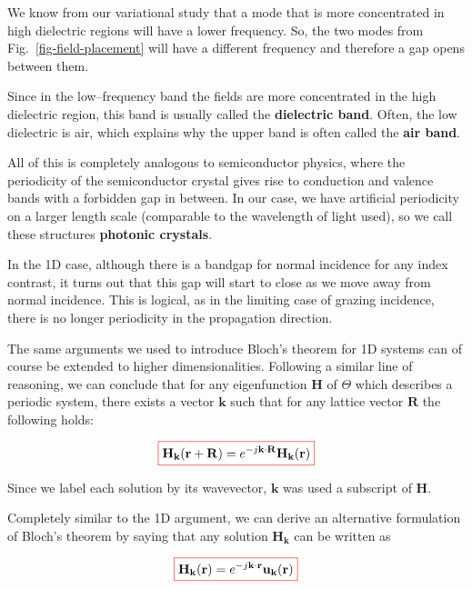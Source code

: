 We know from our variational study that a mode that is more concentrated in high dielectric regions will have a lower frequency. So, the two modes from Fig.~\ref{fig-field-placement} will have a different frequency and therefore a gap opens between them.

Since in the low--frequency band the fields are more concentrated in the high dielectric region, this band is usually called the \textbf{dielectric band}. Often, the low dielectric is air, which explains why the upper band is often called the \textbf{air band}.

All of this is completely analogous to semiconductor physics, where the periodicity of the semiconductor crystal gives rise to conduction and valence bands with a forbidden gap in between. In our case, we have artificial periodicity on a larger length scale (comparable to the wavelength of light used), so we call these structures \textbf{photonic crystals}.

In the 1D case, although there is a bandgap for normal incidence for any index contrast, it turns out that this gap will start to close as we move away from normal incidence. This is logical, as in the limiting case of grazing incidence, there is no longer periodicity in the propagation direction.

\pagebreak


The same arguments we used to introduce Bloch's theorem for 1D systems can of course be extended to higher dimensionalities. Following a similar line of reasoning, we can conclude that for any eigenfunction ${\mathbf H}$ of $\Theta$ which describes a periodic system, there exists a vector ${\mathbf k}$ such that for any lattice vector ${\mathbf R}$ the following holds:

\begin{equation}
\fbox{$\displaystyle
{\mathbf H}_{\mathbf k} ({\mathbf r}+ {\mathbf R}) = e^{-j {\mathbf k} \cdot {\mathbf R}} {\mathbf H}_{\mathbf k} ({\mathbf r})
$}
\end{equation} 

Since we label each solution by its wavevector, ${\mathbf k}$ was used a subscript of ${\mathbf H}$.

Completely similar to the 1D argument, we can derive an alternative formulation of Bloch's theorem by saying that any solution ${\mathbf H}_{\mathbf k}$ can be written as

\begin{equation}
\fbox{$\displaystyle
{\mathbf H}_{\mathbf k} ({\mathbf r}) = e^{-j {\mathbf k} \cdot {\mathbf r}} {\mathbf u}_{\mathbf k} ({\mathbf r})
$}
\end{equation} 

